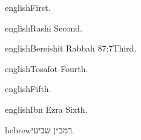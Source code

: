 \documentclass{article}
\begin{document}
\begin{mekor}
\begin{mekorlang}{english}{}First.\end{mekorlang}
\end{mekor}
\begin{mekor}
\begin{mekorlang}{english}{Rashi \sham}Second.\end{mekorlang}
\end{mekor}
\begin{mekor}
\begin{mekorlang}{english}{Bereishit Rabbah 87:7}Third.\end{mekorlang}
\end{mekor}
\begin{mekor}
\begin{mekorlang}{english}{Tosafot \sham}Fourth.\end{mekorlang}
\end{mekor}
\begin{mekor}
\begin{mekorlang}{english}{}Fifth.\end{mekorlang}
\end{mekor}
\begin{mekor}
\begin{mekorlang}{english}{Ibn Ezra \sham}Sixth.\end{mekorlang}
\end{mekor}
\begin{mekor}
\begin{mekorlang}{hebrew}{רמב״ן \sham}שביעי.\end{mekorlang}
\end{mekor}
\end{document}

